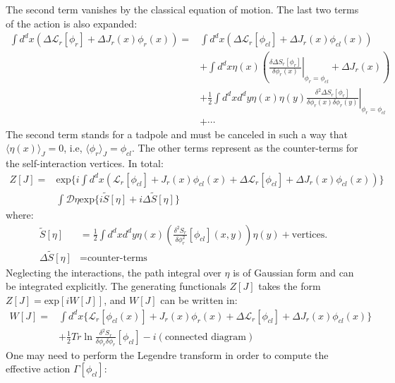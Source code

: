 \documentclass[fleqn]{article}
\begin{document}
The second term vanishes by the classical equation of motion. The last two terms of the action is also expanded:
\begin{align}
\int d^{d}x (\Delta \mathcal{L}_r[\phi_r]  + \Delta J_{r}(x)\phi_{r}(x))  = &\int d^{d}x (\Delta \mathcal{L}_r[\phi_{cl}]  + \Delta J_{r}(x)\phi_{cl}(x)) \nonumber \\
&+ \int d^{d}x \eta(x) (\left.\frac{\delta \Delta S_{r}[\phi_{r}]}{\delta \phi_{r}(x)} \right|_{\phi_{r} = \phi_{cl}} + \Delta J_{r}(x) ) \nonumber  \\
& + \frac{1}{2} \int d^{d}x d^{d}y \eta (x)\eta (y) \left. \frac{\delta^{2} \Delta S_{r}[\phi_{r}]}{\delta \phi_{r}(x) \delta \phi_{r} (y)} \right|_{\phi_{r} = \phi_{cl}} \nonumber \\
&+ \cdots
\end{align}
The second term stands for a tadpole and must be canceled in such a way that $\langle \eta(x) \rangle _{J} = 0$, i.e, $\langle \phi _{r}\rangle _{J} = \phi _{cl}$. The other terms represent as the counter-terms for the self-interaction vertices. In total:
\begin{align}
Z[J] = &\text{exp} \lbrace i\int d^{d}x  (\mathcal{L}_r[\phi_{cl}]  + J_{r}(x)\phi_{cl}(x) +\Delta \mathcal{L}_r[\phi_{cl}]  + \Delta J_{r}(x)\phi_{cl}(x) )\rbrace   \nonumber \\
& \int \mathcal{D} \eta \text{exp} \lbrace  i\tilde{S}[\eta] + i\Delta \tilde{S}[\eta]  \rbrace
\end{align}
where:
\begin{align}
\tilde{S}[\eta] & = \frac{1}{2} \int d^{d}x d^{d}y  \eta (x) (\frac{\delta ^{2} S_{r}}{\delta \phi_{r}^{2}}[\phi_{cl}](x,y))\eta(y) + \text{vertices.} \\
\Delta \tilde{S}[\eta] & = \text{counter-terms}
\end{align}
Neglecting the interactions, the path integral over $\eta$ is of Gaussian form and can be integrated explicitly. The generating functionals $Z[J]$ takes the form $Z[J] = \text{exp} [iW[J]]$, and $W[J]$ can be written in:
\begin{align}
W[J] = &\int d^{d}x \lbrace \mathcal{L}_{r}[\phi _{cl}(x)] + J_{r}(x)\phi_{r}(x) + \Delta \mathcal{L}_{r}[\phi_{cl}] + \Delta J_{r}(x) \phi _{cl}(x) \rbrace \nonumber \\
& + \frac{1}{2} Tr \ln \frac{\delta ^{2} S_{r}}{\delta \phi_{r}\delta \phi_{r}} [\phi_{cl}] - i(\text{connected diagram})
\end{align}
One may need to perform the Legendre transform  in order to compute the effective action $\Gamma[\phi_{cl}]$:
\end{document}
